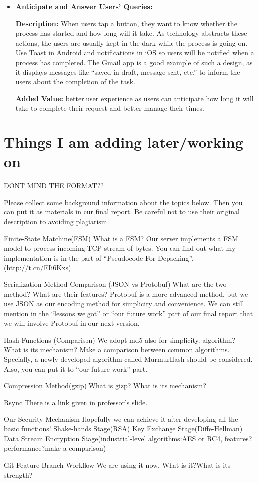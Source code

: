 \documentclass{article}
\begin{document}
\begin{itemize}
\item \textbf{Anticipate and Answer Users’ Queries:}

\textbf{Description:} When users tap a button, they want to know whether the process has started and how long will it take. As technology abstracts these actions, the users are usually kept in the dark while the process is going on. Use Toast in Android and notifications in iOS so users will be notified when a process has completed. The Gmail app is a good example of such a design, as it displays messages like “saved in draft, message sent, etc.” to inform the users about the completion of the task.

\textbf{Added Value:} better user experience as users can anticipate how long it will take to complete their request and better manage their times.
\end{itemize}

\section{Things I am adding later/working on}
DONT MIND THE FORMAT??

Please collect some background information about the  topics below. Then you can put it as materials in our final report. Be careful not to use their original description to avoiding plagiarism.

Finite-State Matchine(FSM)
What is a FSM?
Our server implements a FSM model to process incoming TCP stream of bytes.
You can find out what my implementation is in the part of “Pseudocode For Depacking”. (http://t.cn/EIi6Kxs)

Serialization Method Comparison (JSON vs Protobuf)
What are the two method?
What are their features?
Protobuf is a more advanced method, but we use JSON as our encoding method for simplicity and convenience. We can still mention in the “lessons we got” or “our future work” part of our final report that we will involve Protobuf in our next version.

Hash Functions (Comparison)
We adopt md5 also for simplicity. algorithm?
What is its mechanism?
Make a comparison between common algorithms. Specially, a newly developed algorithm called MurmurHash should be considered. Also, you can put it to “our future work” part.

Compression Method(gzip)
What is gizp?
What is its mechanism?

Rsync
There is a link given in professor’s slide.

Our Security Mechanism
Hopefully we can achieve it after developing all the basic functions!
Shake-hands Stage(RSA)
Key Exchange Stage(Diffe-Hellman)
Data Stream Encryption Stage(industrial-level algorithms:AES or RC4, features?performance?make a comparison)

Git Feature Branch Workflow
We are using it now. What is it?What is its strength?
\end{document}

